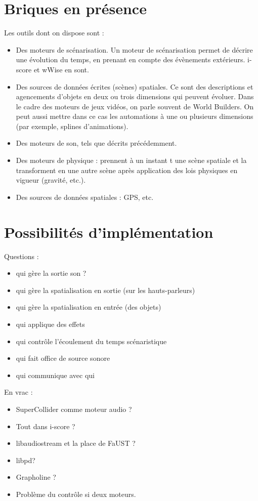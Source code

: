 \documentclass[french,12pt,a4paper]{article}
\begin{document}
\section{Briques en présence}
Les outils dont on dispose sont : 
\begin{itemize}
    \item Des moteurs de scénarisation. Un moteur de scénarisation permet de décrire une évolution du temps, 
    en prenant en compte des évènements extérieurs. 
    i-score et wWise en sont.
    \item Des sources de données écrites (scènes) spatiales. 
    Ce sont des descriptions et agencements d'objets en deux ou trois dimensions qui peuvent évoluer. 
    Dans le cadre des moteurs de jeux vidéos, on parle souvent de World Builders.
    On peut aussi mettre dans ce cas les automations à une ou plusieurs dimensions (par exemple, splines d'animations).
    \item Des moteurs de son, tels que décrits précédemment.
    \item Des moteurs de physique : prennent à un instant t une scène spatiale et la transforment en une autre scène après application des lois physiques en vigueur (gravité, etc.).
    \item Des sources de données spatiales : GPS, etc.
\end{itemize}

\section{Possibilités d'implémentation}
Questions : 
\begin{itemize}
\item qui gère la sortie son ?
\item qui gère la spatialisation en sortie (sur les hauts-parleurs)
\item qui gère la spatialisation en entrée (des objets)
\item qui applique des effets
\item qui contrôle l'écoulement du temps scénaristique
\item qui fait office de source sonore
\item qui communique avec qui
\end{itemize}

En vrac : 
\begin{itemize}
\item SuperCollider comme moteur audio ?
\item Tout dans i-score ? 
\item libaudiostream et la place de FaUST ?
\item libpd?
\item Grapholine ?
\item Problème du contrôle si deux moteurs.
\end{itemize}
\end{document}
